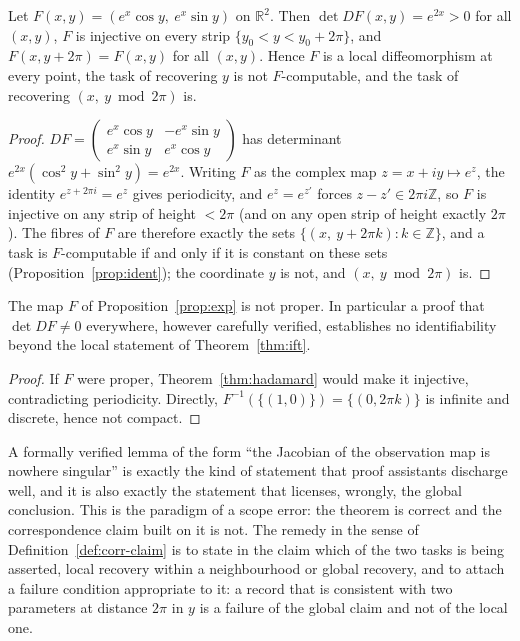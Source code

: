 \begin{proposition}
\label{prop:exp}
Let $F(x,y)=(e^x\cos y,\ e^x\sin y)$ on $\mathbb R^2$. Then $\det DF(x,y)=e^{2x}>0$ for all $(x,y)$, $F$ is injective on every strip $\{y_0<y<y_0+2\pi\}$, and $F(x,y+2\pi)=F(x,y)$ for all $(x,y)$. Hence $F$ is a local diffeomorphism at every point, the task of recovering $y$ is not $F$-computable, and the task of recovering $(x,\ y\bmod2\pi)$ is.
\end{proposition}

\begin{proof}
$DF=\begin{pmatrix}e^x\cos y&-e^x\sin y\\ e^x\sin y&e^x\cos y\end{pmatrix}$ has determinant $e^{2x}(\cos^2y+\sin^2y)=e^{2x}$. Writing $F$ as the complex map $z=x+iy\mapsto e^z$, the identity $e^{z+2\pi i}=e^z$ gives periodicity, and $e^{z}=e^{z'}$ forces $z-z'\in2\pi i\mathbb Z$, so $F$ is injective on any strip of height $<2\pi$ (and on any open strip of height exactly $2\pi$). The fibres of $F$ are therefore exactly the sets $\{(x,\ y+2\pi k):k\in\mathbb Z\}$, and a task is $F$-computable if and only if it is constant on these sets (Proposition~\ref{prop:ident}); the coordinate $y$ is not, and $(x,\ y\bmod2\pi)$ is.
\end{proof}

\begin{corollary}
\label{cor:improper}
The map $F$ of Proposition~\ref{prop:exp} is not proper. In particular a proof that $\det DF\ne0$ everywhere, however carefully verified, establishes no identifiability beyond the local statement of Theorem~\ref{thm:ift}.
\end{corollary}

\begin{proof}
If $F$ were proper, Theorem~\ref{thm:hadamard} would make it injective, contradicting periodicity. Directly, $F^{-1}(\{(1,0)\})=\{(0,2\pi k)\}$ is infinite and discrete, hence not compact.
\end{proof}

A formally verified lemma of the form ``the Jacobian of the observation map is nowhere singular'' is exactly the kind of statement that proof assistants discharge well, and it is also exactly the statement that licenses, wrongly, the global conclusion. This is the paradigm of a scope error: the theorem is correct and the correspondence claim built on it is not. The remedy in the sense of Definition~\ref{def:corr-claim} is to state in the claim which of the two tasks is being asserted, local recovery within a neighbourhood or global recovery, and to attach a failure condition appropriate to it: a record that is consistent with two parameters at distance $2\pi$ in $y$ is a failure of the global claim and not of the local one.

